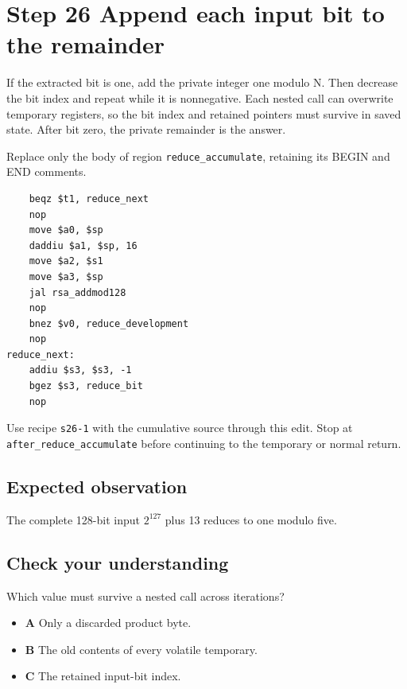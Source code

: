 \section{Step 26 Append each input bit to the remainder}\label{rsa-s26}

If the extracted bit is one, add the private integer one modulo N. Then decrease the bit index and repeat while it is nonnegative. Each nested call can overwrite temporary registers, so the bit index and retained pointers must survive in saved state. After bit zero, the private remainder is the answer.

Replace only the body of region \texttt{reduce\_accumulate}, retaining its BEGIN and END comments.

\begin{verbatim}
    beqz $t1, reduce_next
    nop
    move $a0, $sp
    daddiu $a1, $sp, 16
    move $a2, $s1
    move $a3, $sp
    jal rsa_addmod128
    nop
    bnez $v0, reduce_development
    nop
reduce_next:
    addiu $s3, $s3, -1
    bgez $s3, reduce_bit
    nop
\end{verbatim}

Use recipe \texttt{s26-1} with the cumulative source through this edit. Stop at \texttt{after\_reduce\_accumulate} before continuing to the temporary or normal return.

\subsection{Expected observation}
The complete 128-bit input \(2^{127}\) plus 13 reduces to one modulo five.

\subsection{Check your understanding}
Which value must survive a nested call across iterations?

\begin{itemize}
  \item \textbf{A} Only a discarded product byte.
  \item \textbf{B} The old contents of every volatile temporary.
  \item \textbf{C} The retained input-bit index.
\end{itemize}
